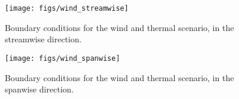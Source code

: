 
%
%
\begin{figure}[!htb]
  \begin{center}
    \texttt{[image: figs/wind\_streamwise]}
    \caption{Boundary conditions for the wind and thermal scenario, in
   the streamwise direction.} 
    \label{fig:windstream}
  \end{center}
\end{figure}

\begin{figure}[!htb]
  \begin{center}
    \texttt{[image: figs/wind\_spanwise]}
    \caption{Boundary conditions for the wind and thermal scenario, in
   the spanwise direction. } 
    \label{fig:windspan}
  \end{center}
\end{figure}

